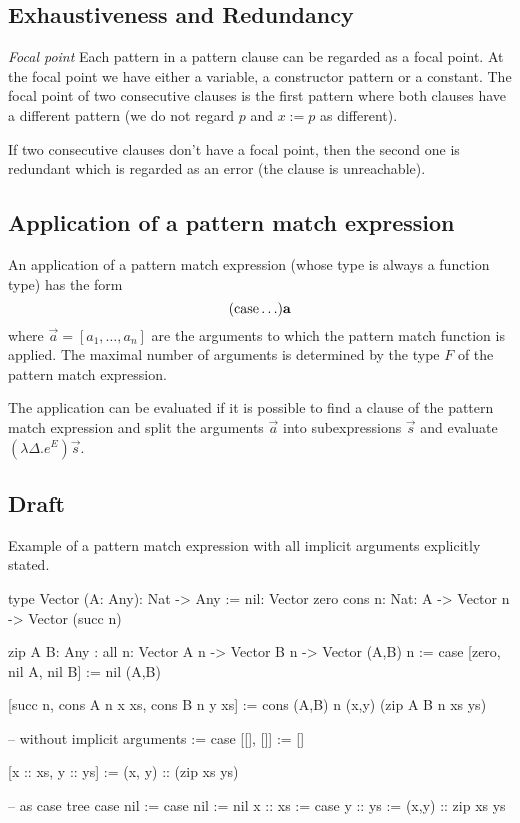 \subsection{Exhaustiveness and Redundancy}

\emph{Focal point}
Each pattern in a pattern clause can be regarded as a focal
point. At the focal point we have either a variable, a constructor pattern or a
constant. The focal point of two consecutive clauses is the first pattern where
both clauses have a different pattern (we do not regard $p$ and $x:=p$ as
different).

If two consecutive clauses don't have a focal point, then the second one is
redundant which is regarded as an error (the clause is unreachable).








\subsection{Application of a pattern match expression}

An application of a pattern match expression (whose type is always a function
type) has the form
$$
({\text{case}} \ldots) {\mathbf a}
$$
where $\vec a = [a_1, \ldots, a_n]$ are the arguments to which the pattern match
function is applied. The maximal number of arguments is determined by the type
$F$ of the pattern match expression.

The application can be evaluated if it is possible to find a clause of the
pattern match expression and split the arguments $\vec a$ into subexpressions
$\vec s$ and evaluate $(\lambda \Delta. e^E) \vec s$.




\subsection{Draft}

Example of a pattern match expression with all implicit arguments explicitly
stated.

\begin{alba}
    type Vector (A: Any): Nat -> Any :=
        nil: Vector zero
        cons {n: Nat}: A -> Vector n -> Vector (succ n)

    zip {A B: Any}
    : all {n}: Vector A n -> Vector B n -> Vector (A,B) n
    := case
        [{zero}, nil {A}, nil {B}] := nil {(A,B)}

        [{succ n}, cons {A} {n} x xs, cons {B} {n} y xs] :=
            cons {(A,B)} {n} (x,y) (zip {A} {B} {n} xs ys)

    -- without implicit arguments
    := case
        [[], []]           := []

        [x :: xs, y :: ys] := (x, y) :: (zip xs ys)

    -- as case tree
    case
        nil :=
            case nil :=
                nil
        x :: xs :=
            case y :: ys :=
                (x,y) :: zip xs ys
\end{alba}


